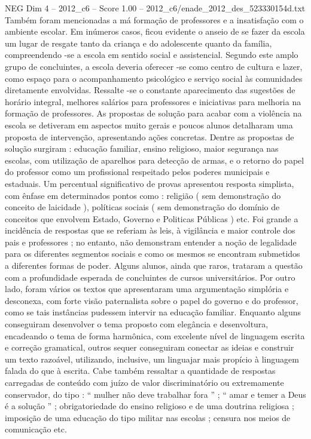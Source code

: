 \begin{textsample}{NEG Dim 4 – 2012\_c6 – Score 1.00 – 2012\_c6/enade\_2012\_des\_523330154d.txt}
Também foram mencionadas a má formação de professores e a insatisfação com o ambiente escolar.
Em inúmeros casos, ficou evidente o anseio de se fazer da escola um lugar de resgate tanto da criança e do adolescente quanto da família, compreendendo -se a escola em sentido social e assistencial.
Segundo este amplo grupo de concluintes, a escola deveria oferecer -se como centro de cultura e lazer, como espaço para o acompanhamento psicológico e serviço social às comunidades diretamente envolvidas.
Ressalte -se o constante aparecimento das sugestões de horário integral, melhores salários para professores e iniciativas para melhoria na formação de professores.
As propostas de solução para acabar com a violência na escola se detiveram em aspectos muito gerais e poucos alunos detalharam uma proposta de intervenção, apresentando ações concretas.
Dentre as propostas de solução surgiram : educação familiar, ensino religioso, maior segurança nas escolas, com utilização de aparelhos para detecção de armas, e o retorno do papel do professor como um profissional respeitado pelos poderes municipais e estaduais.
Um percentual significativo de provas apresentou resposta simplista, com ênfase em determinados pontos como : religião ( sem demonstração do conceito de laicidade ), políticas sociais ( sem demonstração do domínio de conceitos que envolvem Estado, Governo e Politicas Públicas ) etc.
Foi grande a incidência de respostas que se referiam às leis, à vigilância e maior controle dos pais e professores ; no entanto, não demonstram entender a noção de legalidade para os diferentes segmentos sociais e como os mesmos se encontram submetidos a diferentes formas de poder.
Alguns alunos, ainda que raros, trataram a questão com a profundidade esperada de concluintes de cursos universitários.
Por outro lado, foram vários os textos que apresentaram uma argumentação simplória e desconexa, com forte visão paternalista sobre o papel do governo e do professor, como se tais instâncias pudessem intervir na educação familiar.
Enquanto alguns conseguiram desenvolver o tema proposto com elegância e desenvoltura, encadeando o tema de forma harmônica, com excelente nível de linguagem escrita e correção gramatical, outros sequer conseguiram conectar as ideias e construir um texto razoável, utilizando, inclusive, um linguajar mais propício à linguagem falada do que à escrita.
Cabe também ressaltar a quantidade de respostas carregadas de conteúdo com juízo de valor discriminatório ou extremamente conservador, do tipo : “ mulher não deve trabalhar fora ” ; “ amar e temer a Deus é a solução ” ; obrigatoriedade do ensino religioso e de uma doutrina religiosa ; imposição de uma educação do tipo militar nas escolas ; censura nos meios de comunicação etc.

\end{textsample}
